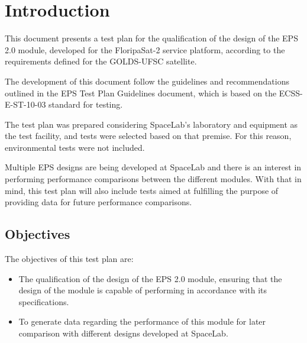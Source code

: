 %
%
%
%
%

%
%
%
%
%

\chapter{Introduction} \label{ch:introduction}

This document presents a test plan for the qualification of the design of the EPS 2.0 module, developed for the FloripaSat-2 service platform, according to the requirements defined for the GOLDS-UFSC satellite.

The development of this document follow the guidelines and recommendations outlined in the EPS Test Plan Guidelines \cite{eps-guidelines} document, which is based on the ECSS-E-ST-10-03 \cite{ecss-e-st-10-03} standard for testing.

The test plan was prepared considering SpaceLab's laboratory and equipment as the test facility, and tests were selected based on that premise.
For this reason, environmental tests were not included.

Multiple EPS designs are being developed at SpaceLab and there is an interest in performing performance comparisons between the different modules.
With that in mind, this test plan will also include tests aimed at fulfilling the purpose of providing data for future performance comparisons.

\section{Objectives}

The objectives of this test plan are:

\begin{itemize}
    \item The qualification of the design of the EPS 2.0 module, ensuring that the design of the module is capable of performing in accordance with its specifications.
    
    \item To generate data regarding the performance of this module for later comparison with different designs developed at SpaceLab.
\end{itemize}